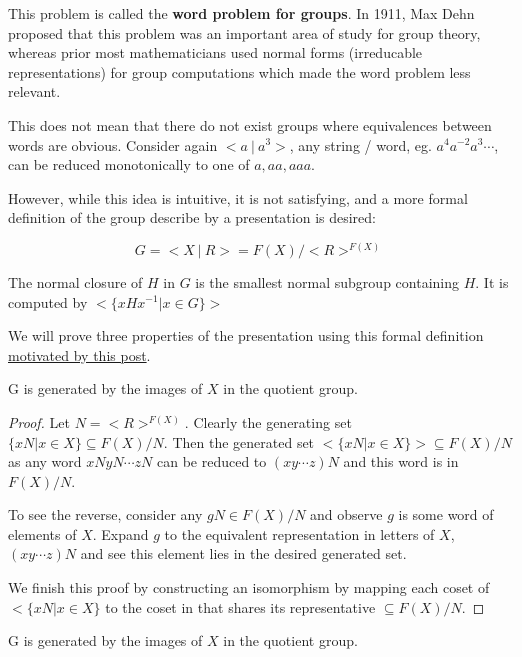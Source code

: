 \documentclass[10pt]{article}
\begin{document}
\begin{note}
	This problem is called the \textbf{word problem for groups}. In 1911, Max
	Dehn proposed that this problem was an important area of study for group
	theory, whereas prior most mathematicians used normal forms (irreducable
	representations) for group computations which made the word problem less
	relevant.
\end{note}

This does not mean that there do not exist groups where equivalences between
words are obvious. Consider again $<a ~|~a^3>$, any string / word, eg.
$a^4a^{-2}a^3\cdots$, can be reduced monotonically to one of $a, aa, aaa$. 

However, while this idea is intuitive, it is not satisfying, and a more formal
definition of the group describe by a presentation is desired:

\[ G = <X~|~R> = F(X) / <R>^{F(X)} \]

\begin{definition}
	The normal closure of $H$ in $G$ is the smallest normal subgroup containing
	$H$. It is computed by $< \{ xHx^{-1} | x \in G \} >$
\end{definition}

We will prove three properties of the presentation using this formal definition
\href{https://math.stackexchange.com/a/695061/1276086}{motivated by this post}.

\begin{proposition}
	G is generated by the images of $X$ in the quotient group.
\end{proposition}
\begin{proof}
Let $N = <R>^{F(X)}$. Clearly the generating set $\{ xN | x \in X \} \subseteq F(X) / N$. Then the
generated set $< \{ xN | x \in X \} > \subseteq F(X) / N$ as any word
$xNyN \cdots zN$ can be reduced to $(xy \cdots z)N$ and this word is in
$F(X) / N$.

To see the reverse, consider any $gN \in F(X) / N$ and observe $g$ is some word of
elements of $X$. Expand $g$ to the equivalent representation in letters of
$X$, $(xy \cdots z)N$ and see this element lies in the desired generated set.

We finish this proof by constructing an isomorphism by mapping each coset of $<
\{ xN | x \in X \}$ to the coset in that shares its representative $\subseteq
F(X) / N$.
\end{proof}

\begin{proposition}
	G is generated by the images of $X$ in the quotient group.
\end{proposition}
\end{document}

